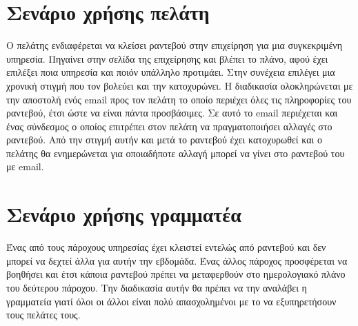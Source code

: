 \section{Σενάριο χρήσης πελάτη}
Ο πελάτης ενδιαφέρεται να κλείσει ραντεβού στην επιχείρηση για μια συγκεκριμένη υπηρεσία. Πηγαίνει στην σελίδα της επιχείρησης και βλέπει το πλάνο, αφού έχει επιλέξει ποια υπηρεσία και ποιόν υπάλληλο προτιμάει. Στην συνέχεια επιλέγει μια χρονική στιγμή που τον βολεύει και την κατοχυρώνει. Η διαδικασία ολοκληρώνεται με την αποστολή ενός email προς τον πελάτη το οποίο περιέχει όλες τις πληροφορίες του ραντεβού, έτσι ώστε να είναι πάντα προσβάσιμες. Σε αυτό το email περιέχεται και ένας σύνδεσμος ο οποίος επιτρέπει στον πελάτη να πραγματοποιήσει αλλαγές στο ραντεβού. Από την στιγμή αυτήν και μετά το ραντεβού έχει κατοχυρωθεί και ο πελάτης θα ενημερώνεται για οποιαδήποτε αλλαγή μπορεί να γίνει στο ραντεβού του με email.

\section{Σενάριο χρήσης γραμματέα}
Ένας από τους πάροχους υπηρεσίας έχει κλειστεί εντελώς από ραντεβού και δεν μπορεί να δεχτεί άλλα για αυτήν την εβδομάδα. Ένας άλλος πάροχος προσφέρεται να βοηθήσει και έτσι κάποια ραντεβού πρέπει να μεταφερθούν στο ημερολογιακό πλάνο του δεύτερου πάροχου. Την διαδικασία αυτήν θα πρέπει να την αναλάβει η γραμματεία γιατί όλοι οι άλλοι είναι πολύ απασχολημένοι με το να εξυπηρετήσουν τους πελάτες τους.